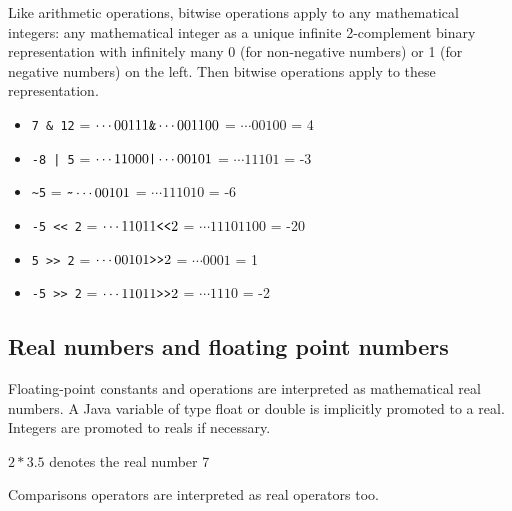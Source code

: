\documentclass[a4paper,11pt,twoside,openright]{report}
\begin{document}
Like arithmetic operations, bitwise operations apply to any
mathematical integers: any mathematical integer as a unique infinite
2-complement binary representation with infinitely many 0 (for
non-negative numbers) or 1 (for negative numbers) on the left. Then
bitwise operations apply to these representation.
\begin{example}
  \begin{itemize}
  \item \verb|7 & 12| = $\cdots 00111 \verb|&| \cdots 001100$ =
    $\cdots 00100$ = 4
  \item \verb+-8 | 5+ = $\cdots 11000 \verb+|+ \cdots 00101$ = $\cdots
    11101$ = -3
  \item \verb+~5+ = $\verb|~|\cdots 00101$ = $\cdots 111010$ = -6
  \item \verb+-5 << 2+ = $\cdots 11011 \verb|<<| 2$ = $\cdots
    11101100$ = -20
  \item \verb+5 >> 2+ = $\cdots 00101 \verb|>>| 2$ = $\cdots 0001$ = 1
  \item \verb+-5 >> 2+ = $\cdots 11011 \verb|>>| 2$ = $\cdots 1110$ =
    -2
  \end{itemize}
\end{example}

\subsection{Real numbers and floating point numbers}

Floating-point constants and operations are interpreted as
mathematical real numbers. A Java variable of type float or double is
implicitly promoted to a real. Integers are promoted to reals if necessary.
\begin{example}
$2 * 3.5$ denotes the real number 7
\end{example}
Comparisons operators are interpreted as real operators too.





\end{document}
